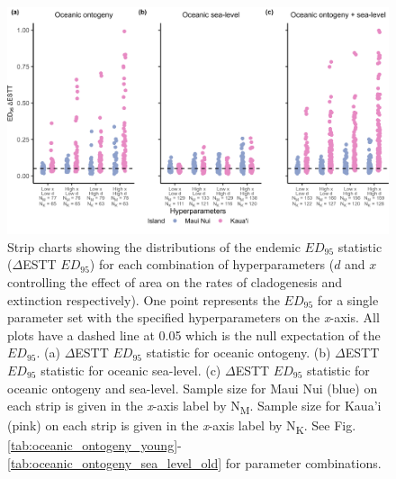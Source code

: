 \begin{figure}
    \centering
    \includegraphics[width=\textwidth]{JBI-21-0508_FigS2.png}
    \caption{Strip charts showing the distributions of the endemic $ED_{95}$ statistic ($\Delta$ESTT $ED_{95}$) for each combination of hyperparameters ($d$ and $x$ controlling the effect of area on the rates of cladogenesis and extinction respectively). One point represents the $ED_{95}$ for a single parameter set with the specified hyperparameters on the \textit{x}-axis. All plots have a dashed line at 0.05 which is the null expectation of the $ED_{95}$. (a) $\Delta$ESTT $ED_{95}$ statistic for oceanic ontogeny. (b) $\Delta$ESTT $ED_{95}$ statistic for oceanic sea-level. (c) $\Delta$ESTT $ED_{95}$ statistic for oceanic ontogeny and sea-level. Sample size for Maui Nui (blue) on each strip is given in the \textit{x}-axis label by N\textsubscript{M}. Sample size for Kaua'i (pink) on each strip is given in the \textit{x}-axis label by N\textsubscript{K}. See Fig. \ref{tab:oceanic_ontogeny_young}-\ref{tab:oceanic_ontogeny_sea_level_old} for parameter combinations.}
    \label{fig:Hyperparameters_endemic}
\end{figure}

